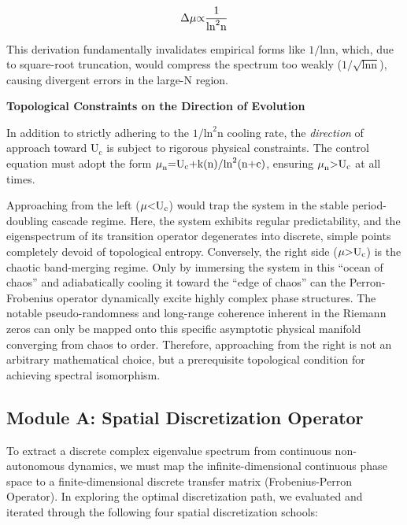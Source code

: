 \documentclass[fractalfract,article,submit,oneauthor,pdftex]{Definitions/mdpi}
\begin{document}
\begin{equation}
\text{\ensuremath{\Delta}}\text{\ensuremath{\mu}}\text{\ensuremath{\propto}}\frac{\text{1}}{\text{ln}^{\text{2}}\text{n}}
\end{equation}

This derivation fundamentally invalidates empirical forms like
\(\text{1/ln}\text{n}\), which, due to square-root truncation, would
compress the spectrum too weakly
(\(\text{1/}\sqrt{\text{ln}\text{n}}\)), causing divergent
errors in the large-N region.

\textbf{Topological Constraints on the Direction of Evolution}

In addition to strictly adhering to the
\(\text{1/}\text{ln}^{\text{2}}\text{n}\) cooling rate, the
\emph{direction} of approach toward \(\text{U}_{\text{c}}\) is subject
to rigorous physical constraints. The control equation must adopt the
form
\(\text{\ensuremath{\mu}}_{\text{n}}\text{=}\text{U}_{\text{c}}\text{+}\text{k}\text{(}\text{n}\text{)/}\text{ln}^{\text{2}}\text{(}\text{n}\text{+}\text{c}\text{)}\),
ensuring \(\text{\ensuremath{\mu}}_{\text{n}}\text{>}\text{U}_{\text{c}}\) at all
times.

Approaching from the left (\(\text{\ensuremath{\mu}}\text{<}\text{U}_{\text{c}}\))
would trap the system in the stable period-doubling cascade regime.
Here, the system exhibits regular predictability, and the eigenspectrum
of its transition operator degenerates into discrete, simple points
completely devoid of topological entropy. Conversely, the right side
(\(\text{\ensuremath{\mu}}\text{>}\text{U}_{\text{c}}\)) is the chaotic band-merging
regime. Only by immersing the system in this ``ocean of chaos'' and
adiabatically cooling it toward the ``edge of chaos'' can the
Perron-Frobenius operator dynamically excite highly complex phase
structures. The notable pseudo-randomness and long-range coherence
inherent in the Riemann zeros can only be mapped onto this specific
asymptotic physical manifold converging from chaos to order. Therefore,
approaching from the right is not an arbitrary mathematical choice, but
a prerequisite topological condition for achieving spectral isomorphism.

\subsection{Module A: Spatial Discretization Operator}

To extract a discrete complex eigenvalue spectrum from continuous
non-autonomous dynamics, we must map the infinite-dimensional continuous
phase space to a finite-dimensional discrete transfer matrix
(Frobenius-Perron Operator). In exploring the optimal discretization
path, we evaluated and iterated through the following four spatial
discretization schools:
\end{document}
